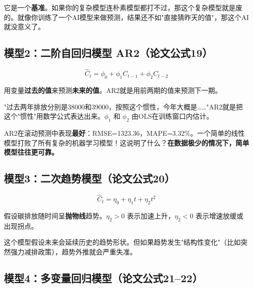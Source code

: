 \documentclass[12pt, a4paper]{article}
\begin{document}
\begin{tipbox}[朴素模型的作用]
它是一个\textbf{基准}。如果你的复杂模型连朴素模型都打不过，那这个复杂模型就是废的。就像你训练了一个AI模型来做预测，结果还不如"直接猜昨天的值"，那这个AI就没意义了。
\end{tipbox}

\subsection{模型2：二阶自回归模型 AR2（论文公式19）}

\[
\hat{C}_t = \phi_0 + \phi_1 C_{t-1} + \phi_2 C_{t-2}
\]

\begin{conceptbox}
用变量\textbf{过去的值}来预测\textbf{未来的值}。AR2就是用前两期的值来预测下一期。
\end{conceptbox}

\begin{examplebox}[AR2的直觉]
"过去两年排放分别是38000和39000，按照这个惯性，今年大概是……"AR2就是把这个"惯性"用数学公式表达出来。$\phi_1$ 和 $\phi_2$ 由OLS在训练窗口内估计。
\end{examplebox}

\begin{purplebox}[论文的冠军模型]
AR2在滚动预测中表现\textbf{最好}：RMSE=1323.36，MAPE=3.32\%。一个简单的线性模型打败了所有复杂的机器学习模型！这说明了什么？\textbf{在数据极少的情况下，简单模型往往更可靠。}
\end{purplebox}

\subsection{模型3：二次趋势模型（论文公式20）}

\[
\hat{C}_t = \eta_0 + \eta_1 t + \eta_2 t^2
\]

\begin{conceptbox}[二次趋势模型]
假设碳排放随时间呈\textbf{抛物线}趋势。$\eta_2 > 0$ 表示加速上升，$\eta_2 < 0$ 表示增速放缓或出现拐点。
\end{conceptbox}

\begin{warningbox}[趋势外推的危险]
这个模型假设未来会延续历史的趋势形状。但如果趋势发生"结构性变化"（比如突然强力减排政策），趋势外推就会严重失准。
\end{warningbox}

\subsection{模型4：多变量回归模型（论文公式21--22）}
\end{document}
